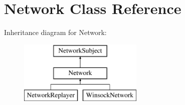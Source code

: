 \hypertarget{classNetwork}{
\section{Network Class Reference}
\label{classNetwork}
}
Inheritance diagram for Network:\begin{figure}[H]
\begin{center}
\leavevmode
\includegraphics[height=3cm]{classNetwork}
\end{center}
\end{figure}
